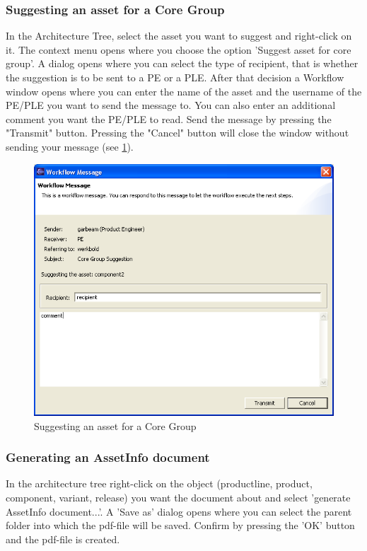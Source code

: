 \subsubsection{Suggesting an asset for a Core Group}

In the Architecture Tree, select the asset you want to suggest and right-click on it. The context menu opens where
 you choose the option 'Suggest asset for core group'. A dialog opens where
 you can select the type of recipient, that is whether the suggestion is to be sent to a PE or a PLE. After
 that decision a Workflow
window opens where you can enter the name of the asset and the username of the
PE/PLE you want to send the message to. You can also enter an additional comment you want 
the PE/PLE to read. Send the message by pressing the "Transmit" 
button. Pressing the "Cancel" button will close the window without sending 
your message (see \ref{core1}).

\begin{figure}[h!]
\begin{center}
\includegraphics[width=12cm]{core1.png}
   \caption{Suggesting an asset for a Core Group}
\label{core1}
\end{center}
\end{figure}\par


\subsubsection{Generating an AssetInfo document}
In the architecture tree right-click on the object (productline, product, component, variant, release) you want the document about
and select 'generate AssetInfo document...'. A 'Save as' dialog opens where you can select the parent folder into which the pdf-file
will be saved. Confirm by pressing the 'OK' button and the pdf-file is created.

